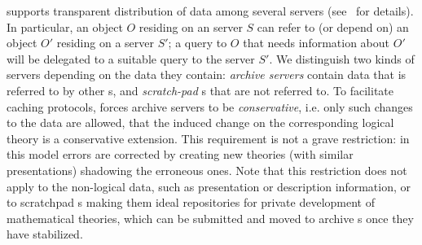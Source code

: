 {\mbase} supports transparent distribution of data among several {\mbase} servers
(see~\cite{KohFra:rkcimss01} for details). In particular, an object $O$ residing on an
{\mbase} server $S$ can refer to (or depend on) an object $O'$ residing on a server $S'$;
a query to $O$ that needs information about $O'$ will be delegated to a suitable query to
the server $S'$.  We distinguish two kinds of {\mbase} servers depending on the data they
contain: {\emph{archive servers}} contain data that is referred to by other {\mbase}s, and
{\emph{scratch-pad}} {\mbase}s that are not referred to. To facilitate caching protocols,
{\mbase} forces archive servers to be {\emph{conservative}}, i.e. only such changes to the
data are allowed, that the induced change on the corresponding logical theory is a
conservative extension.  This requirement is not a grave restriction: in this model errors
are corrected by creating new theories (with similar presentations) shadowing the
erroneous ones.  Note that this restriction does not apply to the non-logical data, such
as presentation or description information, or to scratchpad {\mbase}s making them ideal
repositories for private development of mathematical theories, which can be submitted and
moved to archive {\mbase}s once they have stabilized.


